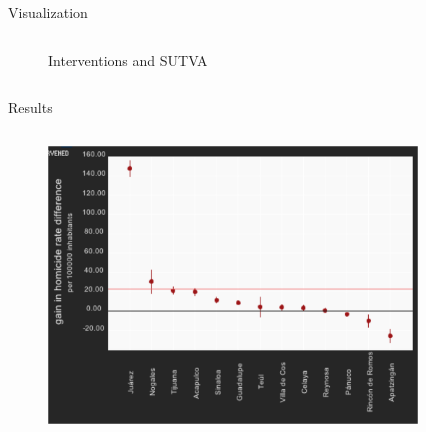 \documentclass[final]{beamer}
\newlength{\onecolwid}
\newlength{\twocolwid}
\begin{document}
\begin{frame}[t]
\begin{columns}[t]
\begin{column}{\twocolwid}
\begin{block}{ Visualization }
\begin{columns}[t,totalwidth=\twocolwid]
\begin{column}{\onecolwid}
\begin{figure}[htdp]
	              \caption*{Interventions and SUTVA}
            \end{figure}
          \end{column}
		\end{columns}
	\end{block}
	\begin{block}{Results}
		\begin{columns}[t,totalwidth=\twocolwid]
	          \begin{column}{\onecolwid}
	            \begin{figure}[htdp]
	              \includegraphics[scale=0.9]{../Images/results.png}
	            \end{figure}
	        \end{column}
\begin{column}{\onecolwid}
	            \begin{figure}[htdp]
	              {\raggedright
	              \begin{minipage}[ht]{0.58\linewidth}
\end{minipage}}
\end{figure}
\end{column}
\end{columns}
\end{block}
\end{column}
\end{columns}
\end{frame}
\end{document}
